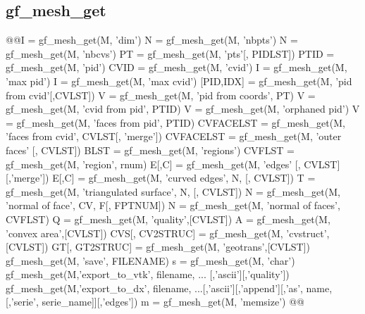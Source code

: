 \subsection{gf\_mesh\_get}
\begin{synopsis}
@@\tint I = gf_mesh_get(M, 'dim')
\tint N = gf\_mesh\_get(M, 'nbpts')
\tint N = gf\_mesh\_get(M, 'nbcvs')
\tmat PT = gf\_mesh\_get(M, 'pts'[, \tivec PIDLST])
\tivec PTID = gf\_mesh\_get(M, 'pid')
\tivec CVID = gf\_mesh\_get(M, 'cvid')
\tint I = gf\_mesh\_get(M, 'max pid')
\tint I = gf\_mesh\_get(M, 'max cvid')
[\tivec PID,\tivec IDX] = gf\_mesh\_get(M, 'pid from cvid'[,\tivec CVLST])
\tivec V = gf\_mesh\_get(M, 'pid from coords', \tmat PT)
\tivec V = gf\_mesh\_get(M, 'cvid from pid', \tivec PTID)
\tivec V = gf\_mesh\_get(M, 'orphaned pid')
\tivec V = gf\_mesh\_get(M, 'faces from pid', \tivec PTID)
\timat CVFACELST = gf\_mesh\_get(M, 'faces from cvid', \tivec CVLST[, 'merge'])
\timat CVFACELST = gf\_mesh\_get(M, 'outer faces' [, \tivec CVLST])
\tivec BLST = gf\_mesh\_get(M, 'regions')
\timat CVFLST = gf\_mesh\_get(M, 'region', \tint rnum)
\tmat E[,\tvec C] = gf\_mesh\_get(M, 'edges' [, \tivec CVLST][,'merge'])
\tmat E[,\tvec C] = gf\_mesh\_get(M, 'curved edges', \tint N, [, \tivec CVLST])
\tmat T = gf_mesh_get(M, 'triangulated surface', \tint N, [, \tivec CVLST])
\tmat N = gf_mesh_get(M, 'normal of face', \tint CV, \tint F[, \tint FPTNUM])
\tmat N = gf_mesh_get(M, 'normal of faces', \timat CVFLST)
\tvec Q = gf_mesh_get(M, 'quality',[CVLST])
\tvec A = gf_mesh_get(M, 'convex area',[CVLST])
\tcvstruct CVS[, CV2STRUC] = gf_mesh_get(M, 'cvstruct',[CVLST])
\tgeotrans GT[, GT2STRUC] = gf_mesh_get(M, 'geotrans',[CVLST])
gf\_mesh\_get(M, 'save', \tstr FILENAME)
\tstr s = gf\_mesh\_get(M, 'char')
gf_mesh_get(M,'export_to_vtk', filename, ... [,'ascii'][,'quality'])
gf_mesh_get(M,'export_to_dx', filename, ...[,'ascii'][,'append'][,'as', name,[,'serie', serie_name]][,'edges'])
\tint m = gf_mesh_get(M, 'memsize')
@@\end{synopsis}
